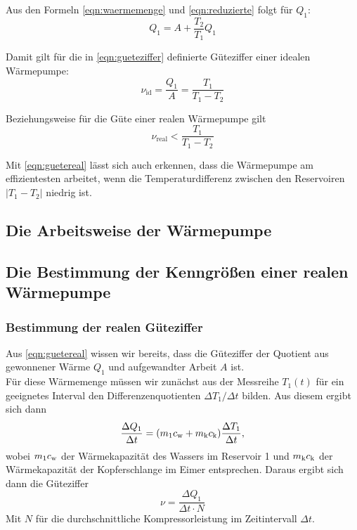 Aus den Formeln \ref{eqn:waermemenge} und \ref{eqn:reduzierte} folgt für $Q_1$:
\begin{equation}
	Q_1 = A + \frac{T_2}{T_1} Q_1
	\label{eqn:q1}
\end{equation}

Damit gilt für die in \ref{eqn:gueteziffer} definierte Güteziffer einer idealen Wärmepumpe:
\begin{equation}
	\nu_\text{id} = \frac{Q_1}{A} = \frac{T_1}{T_1 - T_2}
	\label{eqn:gueteideal}
\end{equation}

Beziehungsweise für die Güte einer realen Wärmepumpe gilt
\begin{equation}
	\nu_\text{real} <
	\frac{T_1}{T_1 - T_2}
	\label{eqn:guetereal}
\end{equation}

Mit \ref{eqn:guetereal} lässt sich auch erkennen, dass die Wärmepumpe am effizientesten arbeitet,
wenn die Temperaturdifferenz zwischen den Reservoiren $\vert T_1 - T_2 \vert$ niedrig ist.

\subsection{Die Arbeitsweise der Wärmepumpe}

\subsection{Die Bestimmung der Kenngrößen einer realen
Wärmepumpe}

\subsubsection{Bestimmung der realen Güteziffer}

Aus \ref{eqn:guetereal} wissen wir bereits, dass die Güteziffer der Quotient aus gewonnener Wärme 
$Q_1$ und aufgewandter Arbeit $A$ ist. \\
Für diese Wärmemenge müssen wir zunächst aus der Messreihe $T_1(t)$ für ein geeignetes Interval 
den Differenzenquotienten $\Delta T_1 / \Delta t$ bilden. Aus diesem ergibt sich dann
\begin{equation}
	\frac{\Delta Q_1}{\Delta t}
	= (m_1 c_\text w + m_\text k c_\text k) \frac{\Delta T_1}{\Delta t},
	\label{eqn:bestgueteziffer1}
\end{equation}
wobei $m_1c_\text w$ der Wärmekapazität des Wassers im Reservoir 1 und $m_\text k c_\text k$ der
Wärmekapazität der Kopferschlange im Eimer entsprechen. Daraus ergibt sich dann die 
Güteziffer
\begin{equation}
	\nu = \frac{\Delta Q_1}{\Delta t \cdot N}
	\label{eqn:gueteziffer}
\end{equation}
Mit $N$ für die durchschnittliche Kompressorleistung im Zeitintervall $\Delta t$.

